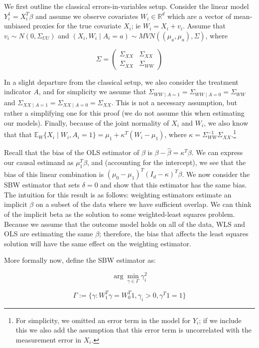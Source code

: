 \documentclass[12pt]{article}
\begin{document}
We first outline the classical errors-in-variables setup. Consider the linear model $Y_i^1 = X_i^T\beta$ and assume we observe covariates $W_i \in \mathbb{R}^d$ which are a vector of mean-unbiased proxies for the true covariate $X_i$; ie $W_i = X_i + v_i$. Assume that $v_i \sim N(0, \Sigma_{UU})$ and $(X_i, W_i \mid A_i = a) \sim MVN((\mu_{a}, \mu_{a}), \Sigma)$, where 

$$
\Sigma = \begin{pmatrix} 
\Sigma_{XX} & \Sigma_{XX} \\ 
\Sigma_{XX} & \Sigma_{WW} 
\end{pmatrix}
$$ 

In a slight departure from the classical setup, we also consider the treatment indicator $A$, and for simplicity we assume that $\Sigma_{WW \mid A = 1} = \Sigma_{WW \mid A = 0} = \Sigma_{WW}$ and $\Sigma_{XX \mid A = 1} = \Sigma_{XX \mid A = 0} = \Sigma_{XX}$. This is not a necessary assumption, but rather a simplifying one for this proof (we do not assume this when estimating our models). Finally, because of the joint normality of $X_i$ and $W_i$, we also know that that $\mathbb{E}_W\{X_i \mid W_i, A_i = 1\} = \mu_1 + \kappa^T(W_i - \mu_1)$, where $\kappa = \Sigma_{WW}^{-1}\Sigma_{XX}$.\footnote{For simplicity, we omitted an error term in the model for $Y_i$; if we include this we also add the assumption that this error term is uncorrelated with the measurement error in $X_i$.} 

Recall that the bias of the OLS estimator of $\beta$ is $\beta - \hat{\beta} = \kappa^T\beta$. We can express our causal estimand as $\mu_1^T\beta$, and (accounting for the intercept), we see that the bias of this linear combination is $(\mu_0 - \mu_1)^T(I_d - \kappa)^T\beta$. We now consider the SBW estimator that sets $\delta = 0$ and show that this estimator has the same bias. The intuition for this result is as follows: weighting estimators estimate an implicit $\beta$ on a subset of the data where we have sufficient overlap. We can think of the implicit beta as the solution to some weighted-least squares problem. Because we assume that the outcome model holds on all of the data, WLS and OLS are estimating the same $\beta$; therefore, the bias that affects the least squares solution will have the same effect on the weighting estimator.  

More formally now, define the SBW estimator as:

$$
\arg\min_{\gamma \in \Gamma} \gamma_i^2
$$

$$
\Gamma := \{\gamma: W_1^T\gamma = W_0^T1, \gamma_i > 0, \gamma^T1 = 1\}
$$
\end{document}
